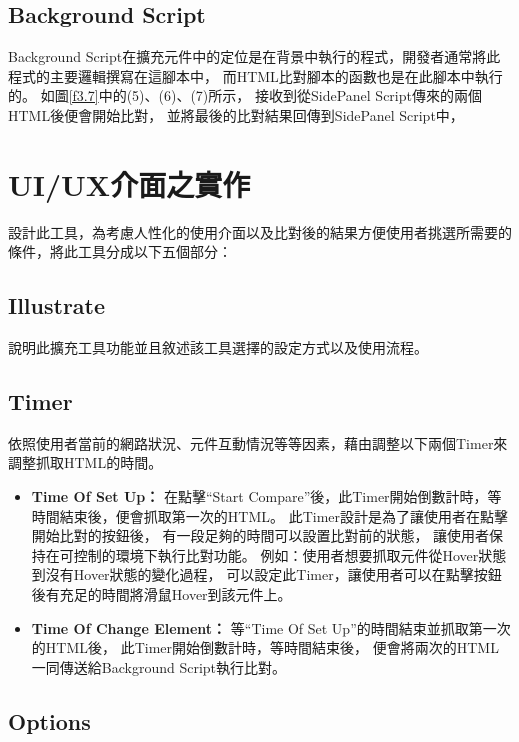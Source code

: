 \subsection{Background Script}\label{s3.4.2}
Background Script在擴充元件中的定位是在背景中執行的程式，開發者通常將此程式的主要邏輯撰寫在這腳本中，
而HTML比對腳本的函數也是在此腳本中執行的。
如圖\ref{f3.7}中的(5)、(6)、(7)所示，
接收到從SidePanel Script傳來的兩個HTML後便會開始比對，
並將最後的比對結果回傳到SidePanel Script中，



\section{UI/UX介面之實作}\label{s3.5}
設計此工具，為考慮人性化的使用介面以及比對後的結果方便使用者挑選所需要的條件，將此工具分成以下五個部分：
\subsection{Illustrate}\label{s3.5.1}
說明此擴充工具功能並且敘述該工具選擇的設定方式以及使用流程。

\subsection{Timer}\label{s3.5.2}
依照使用者當前的網路狀況、元件互動情況等等因素，藉由調整以下兩個Timer來調整抓取HTML的時間。

\begin{itemize}
    \item\textbf{Time Of Set Up： }
    在點擊``Start Compare''後，此Timer開始倒數計時，等時間結束後，便會抓取第一次的HTML。
    此Timer設計是為了讓使用者在點擊開始比對的按鈕後，
    有一段足夠的時間可以設置比對前的狀態，
    讓使用者保持在可控制的環境下執行比對功能。
    例如：使用者想要抓取元件從Hover狀態到沒有Hover狀態的變化過程，
    可以設定此Timer，讓使用者可以在點擊按鈕後有充足的時間將滑鼠Hover到該元件上。

    \item\textbf{Time Of Change Element： }
    等``Time Of Set Up''的時間結束並抓取第一次的HTML後，
    此Timer開始倒數計時，等時間結束後，
    便會將兩次的HTML一同傳送給Background Script執行比對。

\end{itemize}

\subsection{Options}\label{s3.5.3}

